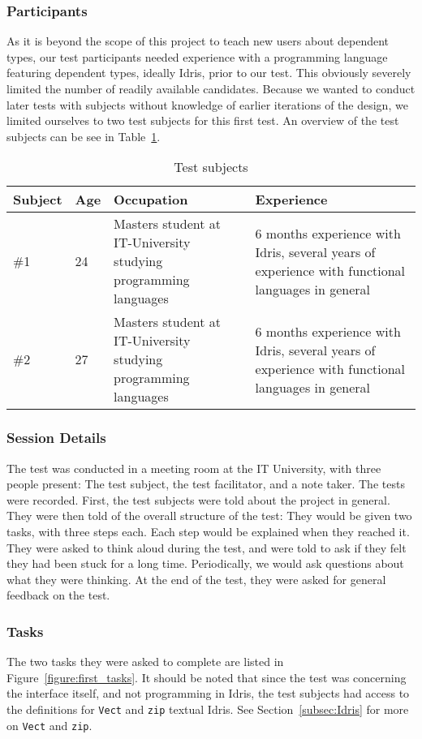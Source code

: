 \subsubsection{Participants}
As it is beyond the scope of this project to teach new users about dependent
types, our test participants needed experience with a programming language
featuring dependent types, ideally Idris, prior to our test. This obviously
severely limited the number of readily available candidates. Because we wanted
to conduct later tests with subjects without knowledge of earlier iterations of
the design, we limited ourselves to two test subjects for this first test. An
overview of the test subjects can be see in Table~\ref{table:first_test_subjects}.

\begin{table}[h]
\centering
\begin{tabular}{| l | l | p{5cm} | p{5cm} |}
\hline
Subject & Age & Occupation & Experience \\ \hline
\#1 & 24 & Masters student at IT-University studying programming languages & 6 months experience with Idris, several years of experience with functional languages in general \\ \hline
\#2 & 27 & Masters student at IT-University studying programming languages & 6 months experience with Idris, several years of experience with functional languages in general \\ \hline
\end{tabular}
\caption{Test subjects}
\label{table:first_test_subjects}
\end{table}

\subsubsection{Session Details}
The test was conducted in a meeting room at the IT University, with three
people present: The test subject, the test facilitator, and a note taker. The
tests were recorded. First, the test subjects were told about the project in
general. They were then told of the overall structure of the test: They would
be given two tasks, with three steps each. Each step would be explained when
they reached it. They were asked to think aloud during the test, and were told to
ask if they felt they had been stuck for a long time. Periodically, we would
ask questions about what they were thinking. At the end of the test, they were asked for general feedback on the test.

\subsubsection{Tasks}
The two tasks they were asked to complete are listed in Figure~\ref{figure:first_tasks}.
It should be noted that since the test was concerning the interface itself, and
not programming in Idris, the test subjects had access to the definitions for \texttt{Vect} and \texttt{zip} textual Idris. See Section~\ref{subsec:Idris}
for more on \texttt{Vect} and \texttt{zip}.

